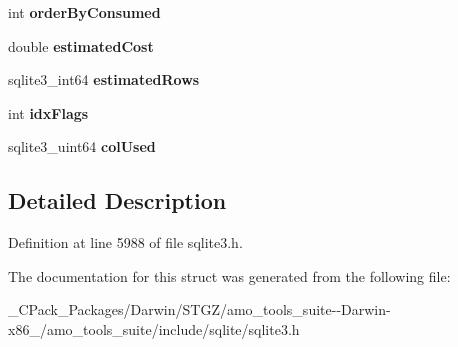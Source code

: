 \begin{DoxyCompactItemize}
int {\bfseries order\+By\+Consumed}
\item 
\mbox{\label{structsqlite3__index__info_aa8b4fe1d2ee38aab57ba5e1da00d7830}} 
double {\bfseries estimated\+Cost}
\item 
\mbox{\label{structsqlite3__index__info_adcdf25dcf9848a6fedf539bb9c921b7f}} 
sqlite3\+\_\+int64 {\bfseries estimated\+Rows}
\item 
\mbox{\label{structsqlite3__index__info_a8acf2a7efbc3e193cf01d2afbd44fdbb}} 
int {\bfseries idx\+Flags}
\item 
\mbox{\label{structsqlite3__index__info_a99787169e2f78c0728bdb339c4107a2e}} 
sqlite3\+\_\+uint64 {\bfseries col\+Used}
\end{DoxyCompactItemize}


\subsection{Detailed Description}


Definition at line 5988 of file sqlite3.\+h.



The documentation for this struct was generated from the following file\+:\begin{DoxyCompactItemize}
\item 
\+\_\+\+C\+Pack\+\_\+\+Packages/\+Darwin/\+S\+T\+G\+Z/amo\+\_\+tools\+\_\+suite-\/-\/\+Darwin-\/x86\+\_/amo\+\_\+tools\+\_\+suite/include/sqlite/sqlite3.\+h\end{DoxyCompactItemize}
